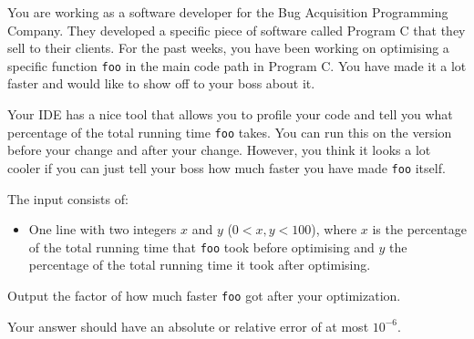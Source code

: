 

You are working as a software developer for the Bug Acquisition Programming
Company. They developed a specific piece of software called Program C that they
sell to their clients. For the past weeks, you have been working on optimising a
specific function \texttt{foo} in the main code path in Program C. You have made
it a lot faster and would like to show off to your boss about it.

Your IDE has a nice tool that allows you to profile your code and tell you what
percentage of the total running time \texttt{foo} takes. You can run this on the
version before your change and after your change. However, you think it looks a
lot cooler if you can just tell your boss how much faster you have made
\texttt{foo} itself.

\begin{Input}
    The input consists of:
    \begin{itemize}
        \item One line with two integers $x$ and $y$ ($0 < x, y < 100$),
        where $x$ is the percentage of the total running time that \texttt{foo} took before optimising
        and $y$ the percentage of the total running time it took after optimising.
    \end{itemize}
\end{Input}

\begin{Output}
    Output the factor of how much faster \texttt{foo} got after your optimization.

    Your answer should have an absolute or relative error of at most $10^{-6}$.
\end{Output}
